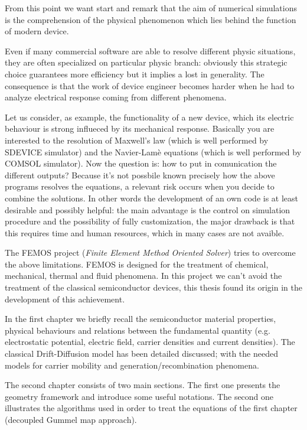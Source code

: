 From this point we want start and remark that the aim of numerical simulations is the comprehension of the physical phenomenon which lies behind the function of modern device. 

Even if many commercial software are able to resolve different physic situations, they are often specialized on particular physic branch: obviously this strategic choice guarantees more efficiency but it implies a lost in generality. The consequence is that the work of device engineer becomes harder when he had to analyze electrical response coming from different phenomena. 

Let us consider, as example, the functionality of a new device, which its electric behaviour is strong influeced by its mechanical response. Basically you are interested to the resolution of Maxwell's law  (which is well performed by SDEVICE simulator) and the Navier-Lam\`e equations (which is well performed by COMSOL simulator). Now the question is: how to put in comunication the different outputs?
Because it's not possbile known precisely how the above programs resolves the equations, a relevant risk occurs when you decide to combine the solutions. 
In other words the development of an own code is at least desirable and possibly helpful: the main advantage is the control on simulation procedure and the possibility of fully customization, the major drawback is that this requires time and human resources, which in many cases are not avaible.   

The FEMOS project (\textit{Finite Element Method Oriented Solver}) tries to overcome the above limitations. FEMOS is designed for the treatment of chemical, mechanical, thermal and fluid phenomena. 
In this project we can't avoid the treatment of the classical semiconductor devices, this thesis found its origin in the development of this achievement.

In the first chapter we briefly recall the semiconductor material properties, physical behaviours and relations between the fundamental quantity (e.g. electrostatic potential, electric field, carrier densities and current densities). The classical Drift-Diffusion model has been detailed discussed; with the needed models for carrier mobility and generation/recombination phenomena.

The second chapter consists of two main sections. The first one presents the geometry framework and introduce some useful notations. The second one illustrates the algorithms used in order to treat the equations of the first chapter (decoupled Gummel map approach).

